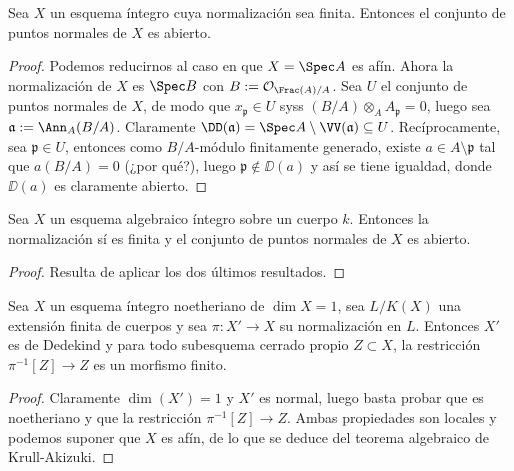\begin{prop}
	Sea $X$ un esquema íntegro cuya normalización sea finita.
	Entonces el conjunto de puntos normales de $X$ es abierto.
\end{prop}
\begin{proof}
	Podemos reducirnos al caso en que $X = \Spec A$ es afín.
	Ahora la normalización de $X$ es $\Spec B$ con $B := \mathcal{O}_{\Frac(A)/A}$.
	Sea $U$ el conjunto de puntos normales de $X$, de modo que $x_{\mathfrak{p}} \in U$ syss $(B/A) \otimes_A A_{\mathfrak{p}} = 0$,
	luego sea $\mathfrak{a} := \Ann_A(B/A)$. Claramente $\DD(\mathfrak{a}) = \Spec A \setminus \VV(\mathfrak{a}) \subseteq U$.
	Recíprocamente, sea $\mathfrak{p} \in U$, entonces como $B/A$-módulo finitamente generado, existe
	$a \in A \setminus \mathfrak{p}$ tal que $a(B/A) = 0$ (¿por qué?), luego $\mathfrak{p} \notin \DD(a)$ y así se tiene
	igualdad, donde $\DD(a)$ es claramente abierto.
\end{proof}
\begin{cor}
	Sea $X$ un esquema algebraico íntegro sobre un cuerpo $k$. Entonces la normalización sí es finita y el conjunto de puntos normales de $X$ es abierto.
\end{cor}
\begin{proof}
	Resulta de aplicar los dos últimos resultados.
\end{proof}

\begin{thm}
	Sea $X$ un esquema íntegro noetheriano de $\dim X = 1$, sea $L/K(X)$ una extensión finita de cuerpos y sea $\pi\colon X' \to X$ su normalización en $L$.
	Entonces $X'$ es de Dedekind y para todo subesquema cerrado propio $Z \subset X$, la restricción $\pi^{-1}[Z] \to Z$ es un morfismo finito.
\end{thm}
\begin{proof}
	Claramente $\dim(X') = 1$ y $X'$ es normal, luego basta probar que es noetheriano y que la restricción $\pi^{-1}[Z] \to Z$.
	Ambas propiedades son locales y podemos suponer que $X$ es afín, de lo que se deduce del teorema algebraico de Krull-Akizuki.
\end{proof}

